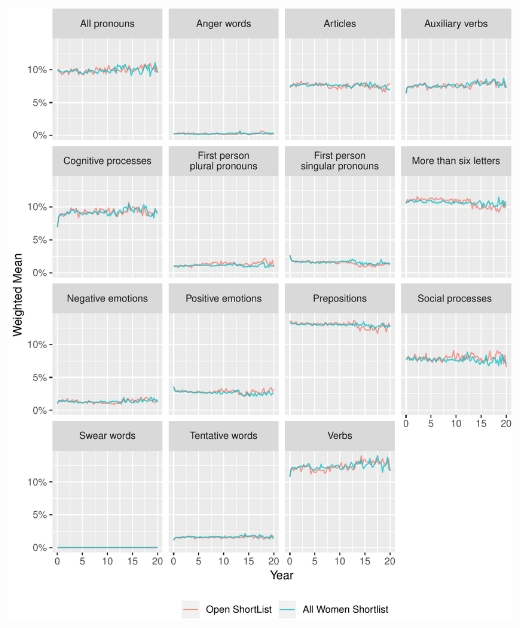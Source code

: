 \documentclass[]{article}
\let\origfigure\figure
\let\endorigfigure\endfigure
\renewenvironment{figure}[1][2] {
    \expandafter\origfigure\expandafter[H]
} {
    \endorigfigure
}
\begin{document}
\begin{figure}
\centering
\includegraphics{methodology_files/figure-latex/sl-key-y-since-start-1.pdf}
\caption{\label{sl-key-y-since-start}Occurence of selected LIWC terms,
by time as MP}
\end{figure}
\end{document}
